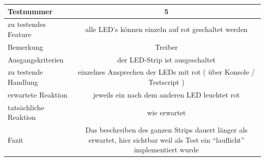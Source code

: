 \documentclass[]{article}
\begin{document}
\begin{longtable}[]{@{}lc@{}}
\toprule
\begin{minipage}[b]{0.25\columnwidth}\raggedright\strut
Testnummer\strut
\end{minipage} & \begin{minipage}[b]{0.55\columnwidth}\centering\strut
5\strut
\end{minipage}\tabularnewline
\midrule
\endhead
\begin{minipage}[t]{0.25\columnwidth}\raggedright\strut
zu testendes Feature\strut
\end{minipage} & \begin{minipage}[t]{0.55\columnwidth}\centering\strut
alle LED's können einzeln auf rot geschaltet werden\strut
\end{minipage}\tabularnewline
\begin{minipage}[t]{0.25\columnwidth}\raggedright\strut
Bemerkung\strut
\end{minipage} & \begin{minipage}[t]{0.55\columnwidth}\centering\strut
Treiber\strut
\end{minipage}\tabularnewline
\begin{minipage}[t]{0.25\columnwidth}\raggedright\strut
Ausgangskriterien\strut
\end{minipage} & \begin{minipage}[t]{0.55\columnwidth}\centering\strut
der LED-Strip ist ausgeschaltet\strut
\end{minipage}\tabularnewline
\begin{minipage}[t]{0.25\columnwidth}\raggedright\strut
zu testende Handlung\strut
\end{minipage} & \begin{minipage}[t]{0.55\columnwidth}\centering\strut
einzelnes Ansprechen der LEDs mit rot ( über Konsole / Testscript
)\strut
\end{minipage}\tabularnewline
\begin{minipage}[t]{0.25\columnwidth}\raggedright\strut
erwartete Reaktion\strut
\end{minipage} & \begin{minipage}[t]{0.55\columnwidth}\centering\strut
jeweils ein nach dem anderen LED leuchtet rot\strut
\end{minipage}\tabularnewline
\begin{minipage}[t]{0.25\columnwidth}\raggedright\strut
tatsächliche Reaktion\strut
\end{minipage} & \begin{minipage}[t]{0.55\columnwidth}\centering\strut
wie erwartet\strut
\end{minipage}\tabularnewline
\begin{minipage}[t]{0.25\columnwidth}\raggedright\strut
Fazit\strut
\end{minipage} & \begin{minipage}[t]{0.55\columnwidth}\centering\strut
Das beschreiben des ganzen Strips dauert länger als erwartet, hier
sichtbar weil als Test ein ``lauflicht'' implementiert wurde\strut
\end{minipage}\tabularnewline
\bottomrule
\end{longtable}
\end{document}
